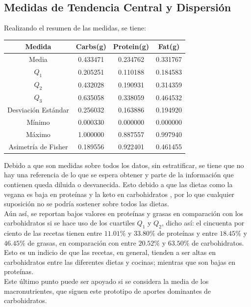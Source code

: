 \documentclass[12pt,a4paper]{article}
\begin{document}
    \subsection{Medidas de Tendencia Central y Dispersión}
    Realizando el resumen de las medidas, se tiene:
    \begin{center}
        \begin{tabular}{|c|ccc|}
            \hline
            Medida & Carbs(g) & Protein(g) & Fat(g) \\
            \hline
            Media               & 0.433471 & 0.234762 & 0.331767 \\
            $Q_1$               & 0.205251 & 0.110188 & 0.184583 \\
            $Q_2$               & 0.432028 & 0.190931 & 0.314359 \\
            $Q_3$               & 0.635058 & 0.338059 & 0.464532 \\
            Desviación Estándar & 0.256032 & 0.163886 & 0.194920 \\
            Mínimo              & 0.000330 & 0.000000 & 0.000000 \\
            Máximo              & 1.000000 & 0.887557 & 0.997940 \\
            Asimetría de Fisher & 0.189556 & 0.922401 & 0.461455 \\
            \hline
        \end{tabular}
    \end{center}
    Debido a que son medidas sobre todos los datos, sin estratificar, 
    se tiene que no hay una referencia de lo que se espera obtener y 
    parte de la información que contienen queda diluida o desvanecida. 
    Esto debido a que las dietas como la vegana es baja en proteínas y 
    la keto en carbohidratos \cite{marvastipopular}, por lo que cualquier 
    suposición no se podría sostener sobre todos las dietas.\\

    Aún así, se reportan bajos valores en proteínas y grasas en comparación 
    con los carbohidratos si se hace uso de los cuartiles $Q_1$ y $Q_2$, 
    dicho así: el cincuenta por ciento de las recetas tienen entre $11.01\%$ y 
    $33.80\%$ de proteínas y entre $18.45\%$ y $46.45\%$ de grasas, en comparación 
    con entre $20.52\%$ y $63.50\%$ de carbohidratos. Esto es un indicio de 
    que las recetas, en general, tienden a ser altas en carbohidratos entre las 
    diferentes dietas y cocinas; mientras que son bajas en proteínas.\\
    Este último punto puede ser apoyado si se considera la media de los 
    macronutrientes, que siguen este prototipo de aportes dominantes de 
    carbohidratos.\\
\end{document}
